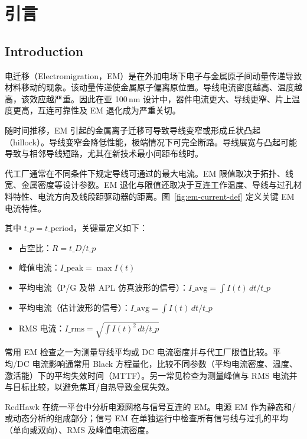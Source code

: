 ﻿%
\label{chap:rel}

\section{引言}
\subsection*{Introduction}

电迁移（Electromigration，EM）是在外加电场下电子与金属原子间动量传递导致材料移动的现象。该动量传递使金属原子偏离原位置。导线电流密度越高、温度越高，该效应越严重。因此在亚 100\,nm 设计中，器件电流更大、导线更窄、片上温度更高，互连可靠性及 EM 退化成为严重关切。

随时间推移，EM 引起的金属离子迁移可导致导线变窄或形成丘状凸起（hillock）。导线变窄会降低性能，极端情况下可完全断路。导线展宽与凸起可能导致与相邻导线短路，尤其在新技术最小间距布线时。

代工厂通常在不同条件下规定导线可通过的最大电流。EM 限值取决于拓扑、线宽、金属密度等设计参数。EM 退化与限值还取决于互连工作温度、导线与过孔材料特性、电流方向及线段距驱动器的距离。图~\ref{fig:em-current-def} 定义关键 EM 电流特性。


其中 $t\_p = t\_{\mathrm{period}}$，关键量定义如下：

\begin{itemize}
  \item 占空比：$R = t\_D / t\_p$
  \item 峰值电流：$I\_{\mathrm{peak}} = \max I(t)$
  \item 平均电流（P/G 及带 APL 仿真波形的信号）：$I\_{\mathrm{avg}} = \int I(t)\,dt / t\_p$
  \item 平均电流（估计波形的信号）：$I\_{\mathrm{avg}} = \int I(t)\,dt / t\_p$
  \item RMS 电流：$I\_{\mathrm{rms}} = \sqrt{\int I(t)^2\,dt / t\_p}$
\end{itemize}

常用 EM 检查之一为测量导线平均或 DC 电流密度并与代工厂限值比较。平均/DC 电流影响通常用 Black 方程量化，比较不同参数（平均电流密度、温度、激活能）下的平均失效时间（MTTF）。另一常见检查为测量峰值与 RMS 电流并与目标比较，以避免焦耳/自热导致金属失效。

RedHawk 在统一平台中分析电源网格与信号互连的 EM。电源 EM 作为静态和/或动态分析的组成部分；信号 EM 在单独运行中检查所有信号线与过孔的平均（单向或双向）、RMS 及峰值电流密度。

